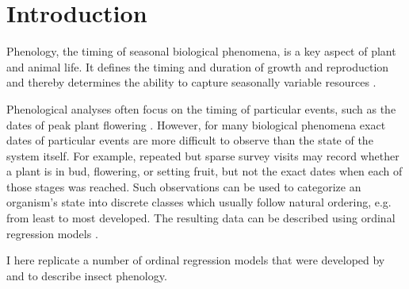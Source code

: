 \section{Introduction}

Phenology, the timing of seasonal biological phenomena, is a key aspect of plant and animal life.
It defines the timing and duration of growth and reproduction and thereby determines the ability to capture seasonally variable resources \citep{chuine2017process}.

Phenological analyses often focus on the timing of particular events, such as the dates of peak plant flowering \citep{aono2008phenological}.%
However, for many biological phenomena exact dates of particular events are more difficult to observe than the state of the system itself.
For example, repeated but sparse survey visits may record whether a plant is in bud, flowering, or setting fruit, but not the exact dates when each of those stages was reached.
Such observations can be used to categorize an organism's state into discrete classes which usually follow natural ordering, e.g. from least to most developed. 
The resulting data can be described using ordinal regression models \cite{mccullagh1980regression,agresti2010analysis}.

I here replicate a number of ordinal regression models that were developed by \citet{dennis1986stochastic} and \citet{candy1991modeling} to describe insect phenology. 


